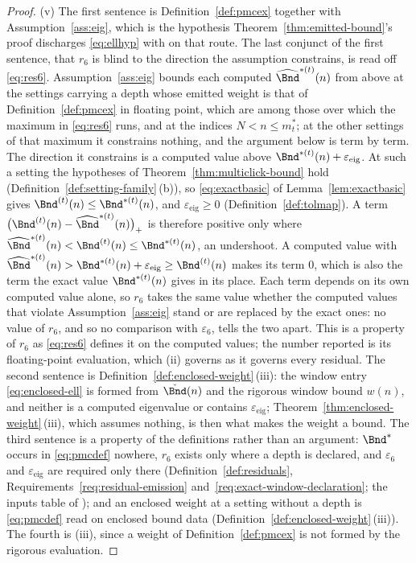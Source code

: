 \begin{proof}
(v) The first sentence is Definition~\ref{def:pmcex} together with
Assumption~\ref{ass:eig}, which is the hypothesis
Theorem~\ref{thm:emitted-bound}'s proof discharges \eqref{eq:ellhyp} with on that
route. The last conjunct of the first sentence, that $r_6$ is blind to the direction
the assumption constrains, is read off \eqref{eq:res6}.
Assumption~\ref{ass:eig} bounds each computed $\widehat\Bnd^{\ast(t)}(n)$
from above at the settings carrying a depth whose emitted weight is that of
Definition~\ref{def:pmcex} in floating point, which are among those over
which the maximum in \eqref{eq:res6} runs, and at the indices
$N<n\le m^{\ast}_t$; at the other settings of that maximum it constrains
nothing, and the argument below is term by term. The
direction it constrains is a computed value above
$\Bnd^{\ast(t)}(n)+\varepsilon_{\mathrm{eig}}$. At such a setting the
hypotheses of Theorem~\ref{thm:multiclick-bound} hold
(Definition~\ref{def:setting-family}\,(b)), so \eqref{eq:exactbasic} of
Lemma~\ref{lem:exactbasic} gives $\Bnd^{(t)}(n)\le\Bnd^{\ast(t)}(n)$, and
$\varepsilon_{\mathrm{eig}}\ge0$ (Definition~\ref{def:tolmap}). A term
$\big(\Bnd^{(t)}(n)-\widehat\Bnd^{\ast(t)}(n)\big)_{+}$ is therefore positive
only where $\widehat\Bnd^{\ast(t)}(n)<\Bnd^{(t)}(n)\le\Bnd^{\ast(t)}(n)$, an
undershoot. A computed value with
$\widehat\Bnd^{\ast(t)}(n)>\Bnd^{\ast(t)}(n)+\varepsilon_{\mathrm{eig}}
\ge\Bnd^{(t)}(n)$ makes its term $0$, which is also the term the exact value
$\Bnd^{\ast(t)}(n)$ gives in its place. Each term depends on its own computed
value alone, so $r_6$ takes the same value whether the computed values that
violate Assumption~\ref{ass:eig} stand or are replaced by the exact ones: no
value of $r_6$, and so no comparison with $\varepsilon_6$, tells the two
apart. This is a property of $r_6$ as \eqref{eq:res6} defines it on the
computed values; the number reported is its floating-point evaluation, which
(ii) governs as it governs every residual.
The second sentence is Definition~\ref{def:enclosed-weight}\,(iii): the window
entry \eqref{eq:enclosed-ell} is formed from $\check\Bnd(n)$ and the rigorous
window bound $w(n)$, and neither is a computed eigenvalue or contains
$\varepsilon_{\mathrm{eig}}$; Theorem~\ref{thm:enclosed-weight}\,(iii), which
assumes nothing, is then what makes the weight a bound.
The third sentence is a property of the definitions rather than an argument:
$\Bnd^{\ast}$ occurs in \eqref{eq:pmcdef} nowhere, $r_6$ exists only where a
depth is declared, and $\varepsilon_6$ and $\varepsilon_{\mathrm{eig}}$ are
required only there (Definition~\ref{def:residuals},
Requirements~\ref{req:residual-emission}
and~\ref{req:exact-window-declaration}; the inputs table of
); and an enclosed weight at a
setting without a depth is \eqref{eq:pmcdef} read on enclosed bound data
(Definition~\ref{def:enclosed-weight}\,(iii)). The fourth is (iii), since a
weight of Definition~\ref{def:pmcex} is not formed by the rigorous evaluation.


\end{proof}
